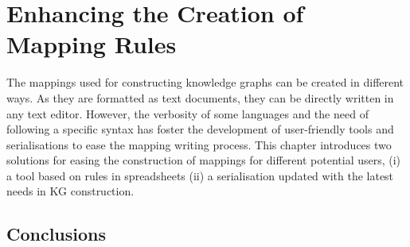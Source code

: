 
\chapter{Enhancing the Creation of Mapping Rules}
\label{chapter:creation}

The mappings used for constructing knowledge graphs can be created in different ways. As they are formatted as text documents, they can be directly written in any text editor. However, the verbosity of some languages and the need of following a specific syntax has foster the development of user-friendly tools and serialisations to ease the mapping writing process. This chapter introduces two solutions for easing the construction of mappings for different potential users, (i) a tool based on rules in spreadsheets (ii) a serialisation updated with the latest needs in KG construction.





\section{Conclusions}